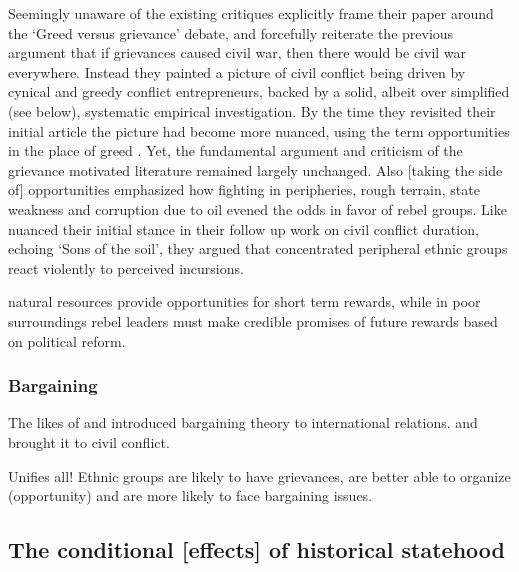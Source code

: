\documentclass[12pt]{article}
\begin{document}
Seemingly unaware of the existing critiques \citet{Collier2004} explicitly frame
their paper around the `Greed versus grievance' debate, and forcefully reiterate
the previous argument that if grievances caused civil war, then there would be
civil war everywhere. Instead they painted a picture of civil conflict being
driven by cynical and greedy conflict entrepreneurs, backed by a solid, albeit
over simplified (see below), systematic empirical investigation. By the time
they revisited their initial article the picture had become more nuanced, using
the term opportunities in the place of greed \citep{Collier2009}. Yet, the
fundamental argument and criticism of the grievance motivated literature
remained largely unchanged. Also [taking the side of] opportunities
\citet{Fearon2003} emphasized how fighting in peripheries, rough terrain, state
weakness and corruption due to oil evened the odds in favor of rebel groups.
Like \citet{Collier2009} \citet{Fearon_2004} nuanced their initial stance in
their follow up work on civil conflict duration, echoing
\citet{WeinerMyron1978SotS} `Sons of the soil', they argued that concentrated
peripheral ethnic groups react violently to perceived incursions.

\citet{Weinstein_2005} natural resources provide opportunities for short term
rewards, while in poor surroundings rebel leaders must make credible promises of
future rewards based on political reform.

\subsubsection{Bargaining} \label{Bargaining}

The likes of \citet{Fearon1995} and \citet{Powell2006} introduced bargaining
theory to international relations. \citet{WalterBarbaraF2002CtPT, Walter2006,
Walter2009} and \citet{Cunningham2006, Cunningham2013c, Cunningham_2013} brought
it to civil conflict.

\citep{Buhaug2009, Cunningham2006, Cunningham2013c, Cunningham_2013, Walter2006,
Walter2009}

\citet{Denny2014} Unifies all! Ethnic groups are likely to have grievances, are
better able to organize (opportunity) and are more likely to face bargaining
issues.

\subsection{The conditional [effects] of historical statehood}
\label{The conditional [effects] of historical statehood}
\end{document}
